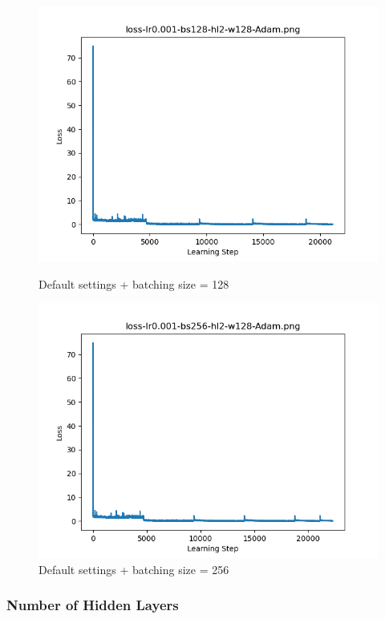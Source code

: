 \documentclass{article}[12pt]
\begin{document}
        \begin{figure}[H]
        \includegraphics[width=\linewidth]{testsResults/loss/bs/loss-lr0.001-bs128-hl2-w128-Adam.png}
        \caption{Default settings + batching size = 128}
        \endminipage
        \includegraphics[width=\linewidth]{testsResults/loss/bs/loss-lr0.001-bs256-hl2-w128-Adam.png}
        \caption{Default settings + batching size = 256}
        \endminipage
    \end{figure}

\subsubsection{Number of Hidden Layers}
\end{document}
